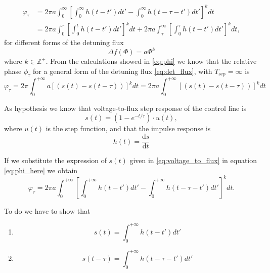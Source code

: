 \begin{align}
    \varphi_\tau &= 2\pi a \int_{0}^{\infty} \left[ \int_{0}^{\infty} h(t - t') dt' - \int_{0}^{\infty} h(t - \tau - t') dt' \right]^k dt \\
    &= 2\pi a \int_{0}^{\tau} \left[ \int_{0}^{t} h(t - t') dt' \right]^k dt + 2\pi a \int_{\tau}^{\infty} \left[ \int_{0}^{\tau} h(t - t') dt' \right]^k dt,
\end{align}
for different forms of the detuning flux 
\begin{equation}\label{eq:det_flux}
    \Delta f(\Phi) = a\Phi^k
\end{equation}
where $k \in \mathbb{Z}^+$.
From the calculations showed in \ref{eq:phi} we know that the relative phase $\phi_\tau$ for a general form of the detuning flux \ref{eq:det_flux}, with $T_{\text{sep}} = \infty$ is
\begin{equation}\label{eq:phi_here}
    \varphi_{\tau} = 2\pi \int_{0}^{+\infty} a \left[ \left( s(t) - s(t - \tau) \right) \right]^k dt = 2\pi a \int_{0}^{+\infty} \left[ \left( s(t) - s(t - \tau) \right) \right]^k dt
\end{equation}

As hypothesis we know that voltage-to-flux step response of the control line is 
\begin{equation}\label{eq:voltage_to_flux}
    s(t) = \left(1 - e^{-t/\tau} \right) \cdot u(t),
\end{equation} where $u(t)$ is the step function, and that the impulse response is 
\begin{equation}\label{eq:h_def}
    h(t) = \frac{\text{d}s}{\text{d}t}
\end{equation}


If we substitute the expression of $s(t)$ given in \ref{eq:voltage_to_flux} in equation \ref{eq:phi_here} we obtain
\begin{equation}\label{eq:first_step_dem}
    \varphi_{\tau} = 2\pi a \int_{0}^{+\infty} \left[ \int_{0}^{+\infty} h(t - t') dt' - \int_{0}^{+\infty} h(t - \tau - t') dt' \right]^k dt.
\end{equation}

To do we have to show that \begin{enumerate}
    \item \begin{equation}\label{eq:first_dem}
        s(t) = \int_0^{+\infty} h(t-t')dt'
    \end{equation}
    \item \begin{equation}\label{eq:sec_dem}
        s(t-\tau) = \int_{0}^{+\infty} h(t-\tau-t')dt'
    \end{equation}
\end{enumerate}

